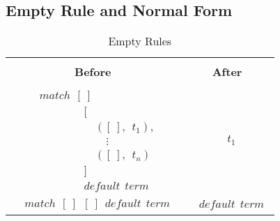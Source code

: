 \documentclass[11pt]{article}
\begin{document}
\subsection {Empty Rule and Normal Form}


\begin{table}[h!]
\begin{center}
\begin{tabular}{ |c|c|} \hline
{}& {}\\
{\bf Before} & {\bf After} \\ 
{}& {}\\
\hline
\begin{minipage}{2in}
{
\begin{align*}
&match~~[~] \\
&\qquad\qquad \Big [ \\ 
&\qquad\qquad\quad ([~],~~t_1),\\ 
&\qquad\qquad\quad \quad \vdots \\ 
&\qquad\qquad\quad ([~],~~t_n) \\
&\qquad\qquad \Big ]\\
&\qquad\qquad default~~term
\end{align*} 
} 
\end {minipage} &
\begin{minipage}{1.5in}
{
\begin{align*}  
& t_1
\end{align*}
}
\end {minipage}\\ 
\hline 

\begin{minipage}{2in}
{
\begin{align*}
&match~~[~]~~[~]~~default~~term
\end{align*} 
} 
\end {minipage} &
\begin{minipage}{1.5in}
{
\begin{align*} 
& default~~term
\end{align*}
}
\end {minipage} 


\tabularnewline
\hline

\end{tabular}
\caption{Empty Rules}
\label{Pmatch:Normalform}
\end{center}
\end{table}
\end{document}
